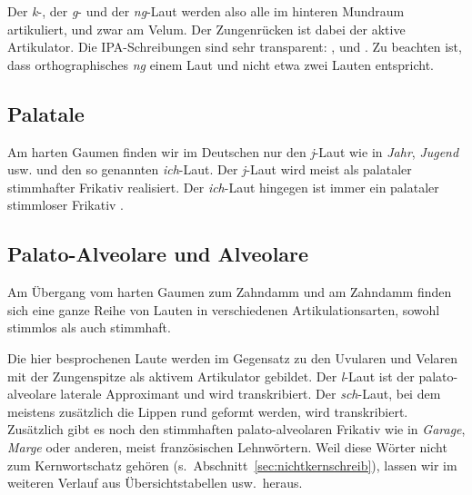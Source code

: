 
Der \textit{k}-, der \textit{g}- und der \textit{ng}-Laut werden also alle im hinteren Mundraum artikuliert, und zwar am Velum.
Der Zungenrücken ist dabei der aktive Artikulator.
Die IPA-Schreibungen sind sehr transparent: \textipa{[k]}, \textipa{[g]} und \textipa{[N]}.
Zu beachten ist, dass orthographisches \textit{ng} einem Laut und nicht etwa zwei Lauten entspricht.

\subsection{Palatale}


Am harten Gaumen finden wir im Deutschen nur den \textit{j}-Laut wie in \textit{Jahr}, \textit{Jugend} usw. und den so genannten \textit{ich}-Laut.
Der \textit{j}-Laut wird meist als palataler stimmhafter Frikativ \textipa{[J]} realisiert.
Der \textit{ich}-Laut hingegen ist immer ein palataler stimmloser Frikativ \textipa{[\c{c}]}.

\subsection{Palato-Alveolare und Alveolare}


Am Übergang vom harten Gaumen zum Zahndamm und am Zahndamm finden sich eine ganze Reihe von Lauten in verschiedenen Artikulationsarten, sowohl stimmlos als auch stimmhaft.


Die hier besprochenen Laute werden im Gegensatz zu den Uvularen und Velaren mit der Zungenspitze als aktivem Artikulator gebildet.
Der \textit{l}-Laut ist der palato-alveolare laterale Approximant und wird \textipa{[l]} transkribiert.
Der \textit{sch}-Laut, bei dem meistens zusätzlich die Lippen rund geformt werden, wird \textipa{[S]} transkribiert.
Zusätzlich gibt es noch den stimmhaften palato-alveolaren Frikativ \textipa{[Z]} wie in \textit{Garage}, \textit{Marge} oder anderen, meist französischen Lehnwörtern.
Weil diese Wörter nicht zum Kernwortschatz gehören (s.\ Abschnitt~\ref{sec:nichtkernschreib}), lassen wir \textipa{[Z]} im weiteren Verlauf aus Übersichtstabellen usw.\ heraus.

